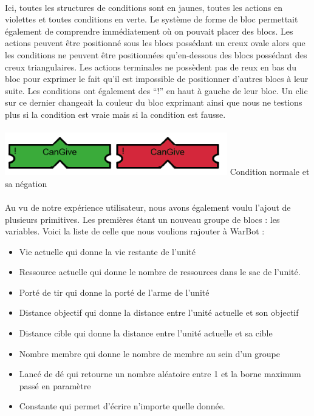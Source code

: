 \documentclass{report}
\begin{document}
\paragraph{}

Ici, toutes les structures de conditions sont en jaunes, toutes les actions en violettes et toutes conditions en verte. \newline
Le système de forme de bloc permettait également de comprendre immédiatement où on pouvait placer des blocs. Les actions peuvent être positionné sous les blocs possédant un creux ovale alors que les conditions ne peuvent être positionnées qu’en-dessous des blocs possédant des creux triangulaires.
Les actions terminales ne possèdent pas de reux en bas du bloc pour exprimer le fait qu’il est impossible de positionner d’autres blocs à leur suite. \newline
Les conditions ont également des “!” en haut à gauche de leur bloc. Un clic sur ce dernier changeait la couleur du bloc exprimant ainsi que nous ne testions plus si la condition est vraie mais si la condition est fausse.

\paragraph{}
\begin{center}
\includegraphics[scale=0.8]{DATA/negation.png}
 {Condition normale et sa négation}
\end{center}
\paragraph{}

  Au vu de notre expérience utilisateur, nous avons également voulu l’ajout de plusieurs primitives. Les premières étant un nouveau groupe de blocs : les variables. Voici la liste de celle que nous voulions rajouter à WarBot :
  \begin{itemize}
\item Vie actuelle qui donne la vie restante de l’unité
\item Ressource actuelle qui donne le nombre de ressources dans le sac de l’unité.
\item Porté de tir qui donne la porté de l’arme de l’unité
\item Distance objectif qui donne la distance entre l’unité actuelle et son objectif
\item Distance cible qui donne la distance entre l’unité actuelle et sa cible
\item Nombre membre qui donne le nombre de membre au sein d’un groupe
\item Lancé de dé qui retourne un nombre aléatoire entre 1 et la borne maximum passé en paramètre
\item Constante qui permet d’écrire n’importe quelle donnée.
\end{itemize}
\end{document}
